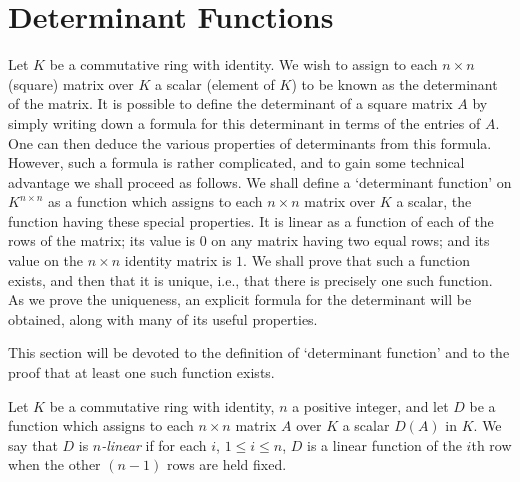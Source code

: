 \section{Determinant Functions}

Let \(K\) be a commutative ring with identity. We wish to assign to each \(n\times n\) (square) matrix over \(K\) a scalar (element of \(K\)) to be known as the determinant of the matrix. It is possible to define the determinant of a square matrix \(A\) by simply writing down a formula for this determinant in terms of the entries of \(A\). One can then deduce the various properties of determinants from this formula. However, such a formula is rather complicated, and to gain some technical advantage we shall proceed as follows. We shall define a `determinant function' on \(K^{n\times n}\) as a function which assigns to each \(n\times n\) matrix over \(K\) a scalar, the function having these special properties. It is linear as a function of each of the rows of the matrix; its value is \(0\) on any matrix having two equal rows; and its value on the \(n\times n\) identity matrix is \(1\). We shall prove that such a function exists, and then that it is unique, i.e., that there is precisely one such function. As we prove the uniqueness, an explicit formula for the determinant will be obtained, along with many of its useful properties.

This section will be devoted to the definition of `determinant function' and to the proof that at least one such function exists.

\begin{definition}
    Let \(K\) be a commutative ring with identity, \(n\) a positive integer, and let \(D\) be a function which assigns to each \(n\times n\) matrix \(A\) over \(K\) a scalar \(D\left(A\right)\) in \(K\). We say that \(D\) is \emph{\(n\)-linear} if for each \(i\), \(1\leqslant i\leqslant n\), \(D\) is a linear function of the \(i\)th row when the other \(\left(n-1\right)\) rows are held fixed.
\end{definition}


